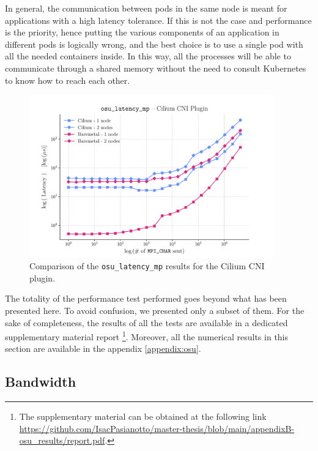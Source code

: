 In general, the communication between pods in the same node is meant for
applications with a high latency tolerance.
If this is not the case and performance is the priority, hence putting the
various components of an application in different pods is logically wrong, and
the best choice is to use a single pod with all the needed containers inside.
In this way, all the processes will be able to communicate through a shared
memory without the need to consult Kubernetes to know how to reach each other.

\begin{figure}
  \centering
  \includegraphics[width=0.94\textwidth]{img/chpt3/cilium-latency_mp}
  \caption{Comparison of the \texttt{osu\_latency\_mp} results for the Cilium
    CNI plugin.}
  \label{fig:cilium-latency}
\end{figure}

The totality of the performance test performed goes beyond what has been
presented here.
To avoid confusion, we presented only a subset of them.
For the sake of completeness, the results of all the tests are available in a
dedicated supplementary material report \footnote{
  The supplementary material can be obtained at the following
  link \url{https://github.com/IsacPasianotto/master-thesis/blob/main/appendixB-osu_results/report.pdf}.
}.
Moreover, all the numerical results in this section are available in the
appendix \ref{appendix:osu}.

\clearpage

\subsection{Bandwidth}\label{subsec:results-bandwidth}

